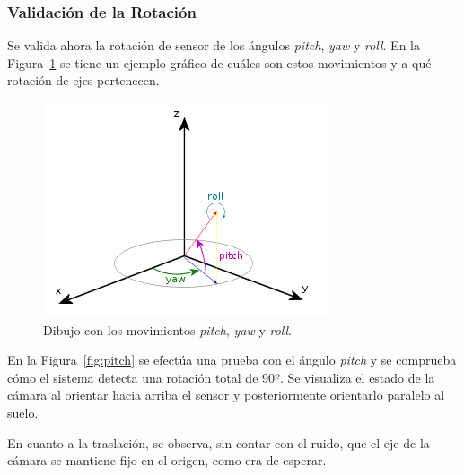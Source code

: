 \subsubsection{Validación de la Rotación}

Se valida ahora la rotación de sensor de los ángulos \textit{pitch}, \textit{yaw} y \textit{roll}. En la Figura~\ref{fig:p-y-r} se tiene un ejemplo gráfico de cuáles son estos movimientos y a qué rotación de ejes pertenecen.

\begin{figure}[th]
\centering
\includegraphics[scale=0.9]{Figures/pitch_yaw_roll.png}
\decoRule
\caption[Explicación gráfica del movimiento \textit{pitch}, \textit{yaw} y \textit{roll}]{Dibujo con los movimientos \textit{pitch}, \textit{yaw} y \textit{roll}.}
\label{fig:p-y-r}
\end{figure}

En la Figura~\ref{fig:pitch} se efectúa una prueba con el ángulo \textit{pitch} y se comprueba cómo el sistema detecta una rotación total de $90º$. Se visualiza el estado de la cámara al orientar hacia arriba el sensor y posteriormente orientarlo paralelo al suelo. 

En cuanto a la traslación, se observa, sin contar con el ruido, que el eje de la cámara se mantiene fijo en el origen, como era de esperar.

